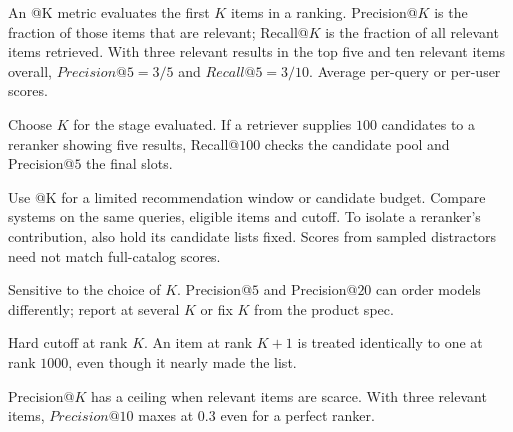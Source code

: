 \clearpage
\thispagestyle{rankingstyle}
\label{sec:k-metrics}

An @K metric evaluates the first $K$ items in a ranking. Precision@$K$ is the fraction of those items that are relevant; Recall@$K$ is the fraction of all relevant items retrieved. With three relevant results in the top five and ten relevant items overall, $Precision@5=3/5$ and $Recall@5=3/10$. Average per-query or per-user scores.

\begin{metricformula}
\end{metricformula}

Choose $K$ for the stage evaluated. If a retriever supplies $100$ candidates to a reranker showing five results, Recall@$100$ checks the candidate pool and Precision@$5$ the final slots.


Use @K for a limited recommendation window or candidate budget. Compare systems on the same queries, eligible items and cutoff. To isolate a reranker's contribution, also hold its candidate lists fixed. Scores from sampled distractors need not match full-catalog scores.

{
    \item Sensitive to the choice of $K$. Precision@$5$ and Precision@$20$ can order models differently; report at several $K$ or fix $K$ from the product spec.
    \item Hard cutoff at rank $K$. An item at rank $K+1$ is treated identically to one at rank $1000$, even though it nearly made the list.
    \item Precision@$K$ has a ceiling when relevant items are scarce. With three relevant items, $Precision@10$ maxes at $0.3$ even for a perfect ranker.
}

